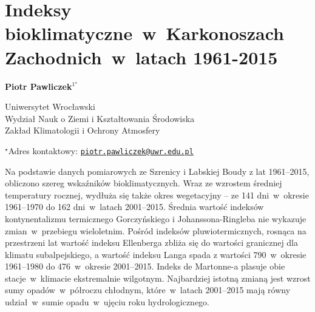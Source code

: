 \documentclass[\main/boa.tex]{subfiles}
\begin{document}
\sloppy


\section{Indeksy bioklimatyczne~w~Karkonoszach Zachodnich~w~latach 1961-2015}

\begin{center}
  {\bf {} Piotr Pawliczek$^{1^\star}$}
\end{center}

\vskip 0.3cm

\begin{affiliations}
\begin{enumerate}
\begin{minipage}{0.915\textwidth}
\centering
\item Uniwersytet Wrocławski\\ Wydział Nauk o Ziemi i Kształtowania Środowiska\\ Zakład Klimatologii i Ochrony Atmosfery\\[-2pt]
\end{minipage}
\end{enumerate}
$^\star$Adres kontaktowy: \href{mailto:piotr.pawliczek@uwr.edu.pl}{\nolinkurl{piotr.pawliczek@uwr.edu.pl}}\\
\end{affiliations}

\vskip 0.5cm


\vskip 0.5cm

Na podstawie danych pomiarowych ze Szrenicy i Labskiej Boudy z lat 1961--2015, obliczono szereg wskaźników bioklimatycznych. Wraz ze wzrostem średniej temperatury rocznej, wydłuża się także okres wegetacyjny -- ze 141 dni~w~okresie 1961--1970 do 162 dni~w~latach 2001--2015. Średnia wartość indeksów kontynentalizmu termicznego Gorczyńskiego i Johanssona-Ringleba nie wykazuje zmian~w~przebiegu wieloletnim. Pośród indeksów pluwiotermicznych, rosnąca na przestrzeni lat wartość indeksu Ellenberga zbliża się do wartości granicznej dla klimatu subalpejskiego, a wartość indeksu Langa spada z wartości 790~w~okresie 1961--1980 do 476~w~okresie 2001--2015. Indeks  de Martonne-a plasuje obie stacje~w~klimacie ekstremalnie wilgotnym. Najbardziej istotną zmianą jest wzrost sumy opadów~w~półroczu chłodnym, które~w~latach 2001--2015 mają równy udział~w~sumie opadu~w~ujęciu roku hydrologicznego.
\end{document}
